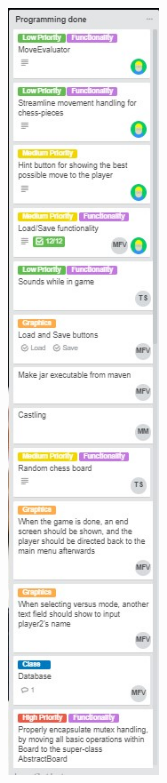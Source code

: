 \documentclass{article}
\begin{document}
\includegraphics[width=4cm]{20180508-programmingdone1.jpg}
\end{document}
